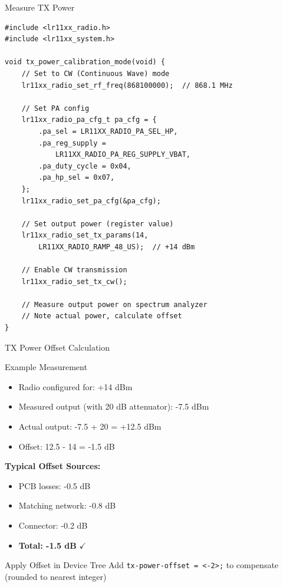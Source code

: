 \documentclass{beamer}
\begin{document}
\begin{frame}[fragile]{Measure TX Power}
\begin{lstlisting}[caption={Test Firmware for Calibration}]
#include <lr11xx_radio.h>
#include <lr11xx_system.h>

void tx_power_calibration_mode(void) {
    // Set to CW (Continuous Wave) mode
    lr11xx_radio_set_rf_freq(868100000);  // 868.1 MHz

    // Set PA config
    lr11xx_radio_pa_cfg_t pa_cfg = {
        .pa_sel = LR11XX_RADIO_PA_SEL_HP,
        .pa_reg_supply =
            LR11XX_RADIO_PA_REG_SUPPLY_VBAT,
        .pa_duty_cycle = 0x04,
        .pa_hp_sel = 0x07,
    };
    lr11xx_radio_set_pa_cfg(&pa_cfg);

    // Set output power (register value)
    lr11xx_radio_set_tx_params(14,
        LR11XX_RADIO_RAMP_48_US);  // +14 dBm

    // Enable CW transmission
    lr11xx_radio_set_tx_cw();

    // Measure output power on spectrum analyzer
    // Note actual power, calculate offset
}
\end{lstlisting}
\end{frame}

\begin{frame}{TX Power Offset Calculation}
\begin{block}{Example Measurement}
\begin{itemize}
    \item Radio configured for: +14 dBm
    \item Measured output (with 20 dB attenuator): -7.5 dBm
    \item Actual output: -7.5 + 20 = +12.5 dBm
    \item Offset: 12.5 - 14 = -1.5 dB
\end{itemize}
\end{block}

\vspace{0.3cm}

\textbf{Typical Offset Sources:}
\begin{itemize}
    \item PCB losses: -0.5 dB
    \item Matching network: -0.8 dB
    \item Connector: -0.2 dB
    \item \textbf{Total: -1.5 dB} $\checkmark$
\end{itemize}

\vspace{0.3cm}

\begin{alertblock}{Apply Offset in Device Tree}
Add \texttt{tx-power-offset = <-2>;} to compensate\\
(rounded to nearest integer)
\end{alertblock}
\end{frame}
\end{document}
